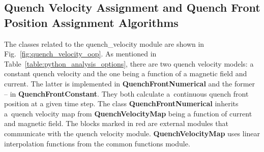 \subsection{Quench Velocity Assignment and Quench Front Position Assignment Algorithms}

The classes related to the quench\_velocity module are shown in Fig.~\ref{fig:quench_velocity_oop}. As mentioned in Table~\ref{table:python_analysis_options}, there are two quench velocity models: a constant quench velocity and the one being a function of a magnetic field and current. The latter is implemented in \textbf{QuenchFrontNumerical} and the former -- in \textbf{QuenchFrontConstant}. They both calculate a~continuous quench front position at a given time step. The class \textbf{QuenchFrontNumerical} inherits a~quench velocity map from \textbf{QuenchVelocityMap} being a function of current and magnetic field. The blocks marked in red are external modules that communicate with the quench velocity module. \textbf{QuenchVelocityMap} uses linear interpolation functions from the common functions module. 

